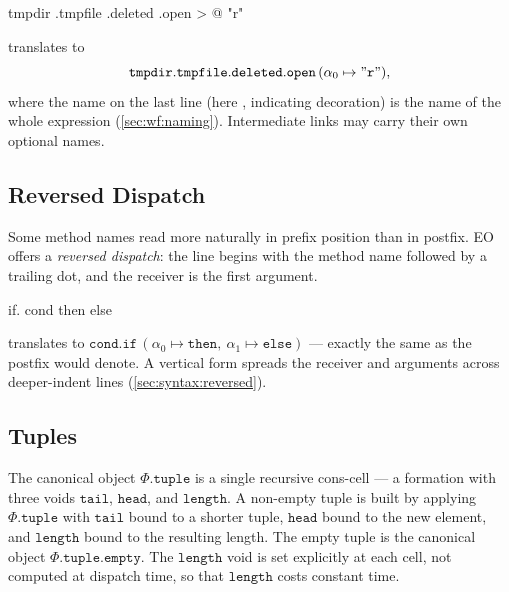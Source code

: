 \begin{ffcode}
tmpdir
.tmpfile
.deleted
.open > @
  "r"
\end{ffcode}

translates to
\begin{equation*}
  \mathtt{tmpdir}.\mathtt{tmpfile}.\mathtt{deleted}.\mathtt{open}\,(\alpha_0 \mapsto \mathtt{"r"}),
\end{equation*}
where the name on the last  line (here , indicating
  decoration) is the name of the whole expression
  (\cref{sec:wf:naming}).
Intermediate links may carry their own optional names.

\subsection{Reversed Dispatch}\label{sec:over:reversed}

Some method names read more naturally in prefix position than in
  postfix.
EO offers a \emph{reversed dispatch}: the line begins with the method name
  followed by a trailing dot, and the receiver is the first argument.

\begin{ffcode}
if. cond then else
\end{ffcode}

translates to \(\mathtt{cond}.\mathtt{if}\,(\alpha_0 \mapsto \mathtt{then},\ \alpha_1 \mapsto \mathtt{else})\) ---
  exactly the same as the postfix  would denote.
A vertical form spreads the receiver and arguments across deeper-indent
  lines (\cref{sec:syntax:reversed}).

\subsection{Tuples}\label{sec:over:tuple}

The canonical object \(\Phi.\mathtt{tuple}\) is a single recursive
  cons-cell --- a formation with three voids \(\mathtt{tail}\),
  \(\mathtt{head}\), and \(\mathtt{length}\).
A non-empty tuple is built by applying \(\Phi.\mathtt{tuple}\) with
  \(\mathtt{tail}\) bound to a shorter tuple,
  \(\mathtt{head}\) bound to the new element, and
  \(\mathtt{length}\) bound to the resulting length.
The empty tuple is the canonical object
  \(\Phi.\mathtt{tuple}.\mathtt{empty}\).
The \(\mathtt{length}\) void is set explicitly at each cell, not
  computed at dispatch time, so that \(\mathtt{length}\) costs
  constant time.

